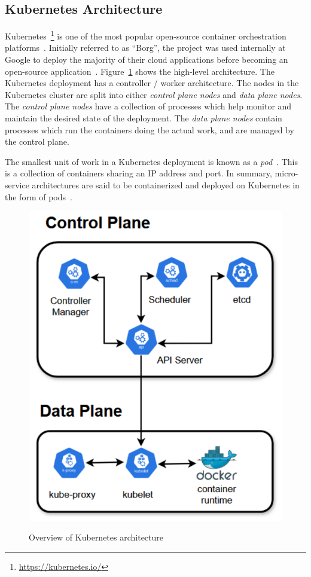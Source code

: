 \subsection{Kubernetes Architecture}
\label{subsec:ch2-k8s-overview}

Kubernetes~\footnote{\url{https://kubernetes.io/}} is one of the most popular open-source container orchestration platforms~\cite{vayghan2021kubernetes}. Initially referred to as ``Borg'', the project was used internally at Google to deploy the majority of their cloud applications before becoming an open-source application~\cite{burns2016borg}. Figure~\ref{fig:k8s-arch} shows the high-level architecture. The Kubernetes deployment has a controller / worker architecture. The nodes in the Kubernetes cluster are split into either \textit{control plane nodes} and \textit{data plane nodes}. The \textit{control plane nodes} have a collection of processes which help monitor and maintain the desired state of the deployment. The \textit{data plane nodes} contain processes which run the containers doing the actual work, and are managed by the control plane.\par
The smallest unit of work in a Kubernetes deployment is known as a \textit{pod}~\cite{baier2017getting}. This is a collection of containers sharing an IP address and port. In summary, micro-service architectures are said to be containerized and deployed on Kubernetes in the form of pods~\cite{vayghan2021kubernetes}.\par
\begin{figure}[htb]
    \centering
    \caption{Overview of Kubernetes architecture}
    \includegraphics[width=0.5\linewidth]{Figures/K8s-Architecture.pdf}
    \label{fig:k8s-arch}
\end{figure}

